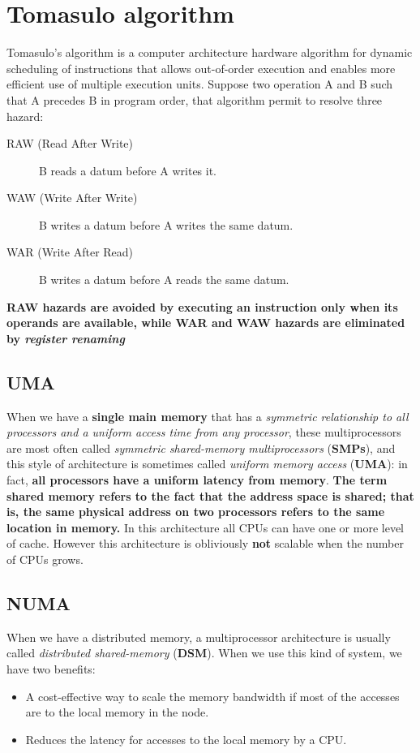 \documentclass[10pt,a4paper]{article}
\begin{document}
\section{Tomasulo algorithm}

Tomasulo’s algorithm is a computer architecture hardware algorithm for dynamic scheduling of instructions that allows out-of-order execution and enables more efficient use of multiple execution units. Suppose two operation A and B such that A precedes B in program order, that algorithm permit to resolve three hazard:

\begin{description}
\item[RAW (Read After Write)] B reads a datum before A writes it.
\item[WAW (Write After Write)] B writes a datum before A writes the same datum.

\item[WAR (Write After Read)] B writes a datum before A reads the same datum.
\end{description}

\textbf{RAW hazards are avoided by executing an instruction only when its operands are available, while WAR and WAW hazards are eliminated by \textit{register renaming}}

\subsection{UMA}

When we have a \textbf{single main memory} that has a \textit{symmetric relationship to all processors and a uniform access time from any processor}, these multiprocessors are most often called \textit{symmetric shared-memory multiprocessors} (\textbf{SMPs}), and this style of architecture is sometimes called \textit{uniform memory access} (\textbf{UMA}): in fact, \textbf{all processors have a uniform latency from memory}. \textbf{The term shared memory refers to the fact that the address space is shared; that is, the same physical address on two processors refers to the same location in memory.} In this architecture all CPUs can have one or more level of cache. However this architecture is obliviously \textbf{not} scalable when the number of CPUs grows.

\subsection{NUMA}

When we have a distributed memory, a multiprocessor architecture is usually called \textit{distributed shared-memory} (\textbf{DSM}). When we use this kind of system, we have two benefits:
\begin{itemize}
\item A cost-effective way to scale the memory bandwidth if most of the accesses are to the local memory in the node.
\item Reduces the latency for accesses to the local memory by a CPU.
\end{itemize}
\end{document}
